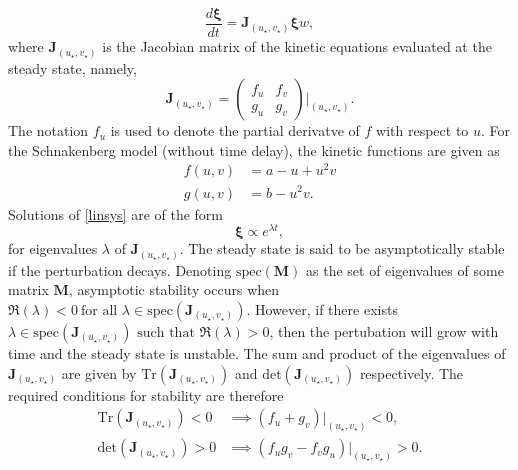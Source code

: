 \begin{equation}\label{linsys}
\frac{d\pmb{\xi}}{dt}=\textbf{J}_{(u_\star,v_\star)}\pmb{\xi}w,
\end{equation}
where $\textbf{J}_{(u_\star,v_\star)}$ is the Jacobian matrix of the kinetic equations evaluated at the steady state, namely,
$$
\textbf{J}_{(u_\star,v_\star)}=\begin{pmatrix}f_u&f_v\\g_u&g_v\end{pmatrix}\Bigg|_{(u_\star,v_\star)}.
$$
The notation $f_u$ is used to denote the partial derivatve of $f$ with respect to $u$. For the Schnakenberg model (without time delay), the kinetic functions are given as
\begin{align*}
f(u,v)&=a-u+u^2v\\
g(u,v)&=b-u^2v.
\end{align*}
Solutions of \eqref{linsys} are of the form
$$
\pmb{\xi}\propto e^{\lambda t},
$$
for eigenvalues $\lambda$ of $\textbf{J}_{(u_\star,v_\star)}$. The steady state is said to be asymptotically stable if the perturbation decays.
Denoting $\text{spec}(\textbf{M})$ as the set of eigenvalues of some matrix $\textbf{M}$, asymptotic stability occurs when $\Re(\lambda)<0 \ \text{for all }\lambda\in \text{spec}(\textbf{J}_{(u_\star,v_\star)})$. However, if there exists $\lambda\in \text{spec}(\textbf{J}_{(u_\star,v_\star)})\text{ such that } \Re(\lambda)>0$,
then the pertubation will grow with time and the steady state is unstable. The sum and product of the eigenvalues of $\textbf{J}_{(u_\star,v_\star)}$
are given by $\text{Tr}(\textbf{J}_{(u_\star,v_\star)})$ and $\text{det}(\textbf{J}_{(u_\star,v_\star)})$ respectively. The required conditions for stability are therefore
\begin{equation}\label{cond1}
    \begin{split}
\text{Tr}(\textbf{J}_{(u_\star,v_\star)})<0 &\implies (f_u+g_v)\big|_{(u_\star,v_\star)}<0, \\
\text{det}(\textbf{J}_{(u_\star,v_\star)})>0 &\implies (f_ug_v-f_vg_u)\big|_{(u_\star,v_\star)}>0.
\end{split}
\end{equation}

